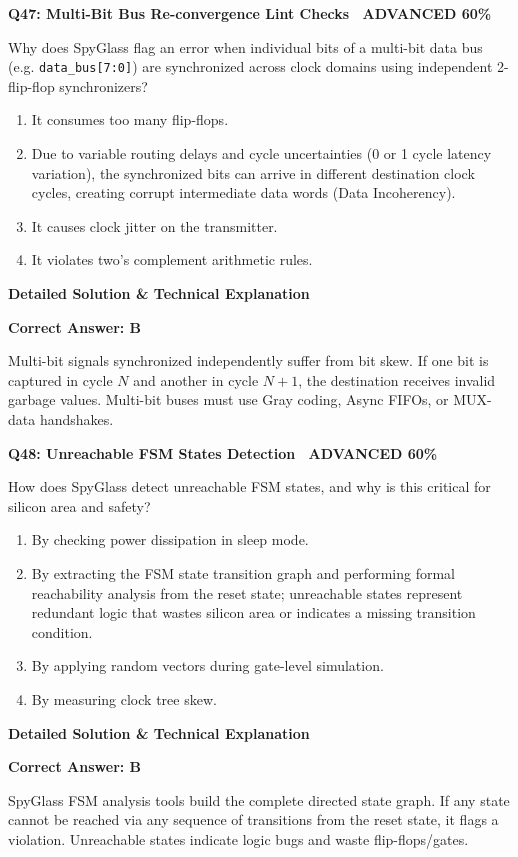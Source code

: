 \documentclass[11pt,a4paper]{article}
\newcommand{\badgeadv}{{\color{white}\colorbox{advred}{\bfseries\sffamily\tiny\ ADVANCED 60\%\ }}}
\newenvironment{qbox}[2]{%
  \begin{mdframed}[style=qstyle]%
  {\bfseries\sffamily\color{primaryblue}#1 \hfill #2}\par\vspace{2pt}%
}{%
  \end{mdframed}%
}
\newenvironment{ansbox}{%
  \begin{mdframed}[style=ansstyle]%
  {\bfseries\sffamily\color{ansgreen}\small Detailed Solution \& Technical Explanation}\par\vspace{2pt}\small%
}{%
  \end{mdframed}%
}
\begin{document}
\begin{qbox}{Q47: Multi-Bit Bus Re-convergence Lint Checks}{\badgeadv}
Why does SpyGlass flag an error when individual bits of a multi-bit data bus (e.g. \texttt{data\_bus[7:0]}) are synchronized across clock domains using independent 2-flip-flop synchronizers?
\begin{enumerate}[label=\textbf{\Alph*.}]
  \item It consumes too many flip-flops.
  \item Due to variable routing delays and cycle uncertainties (0 or 1 cycle latency variation), the synchronized bits can arrive in different destination clock cycles, creating corrupt intermediate data words (Data Incoherency).
  \item It causes clock jitter on the transmitter.
  \item It violates two's complement arithmetic rules.
\end{enumerate}
\end{qbox}
\begin{ansbox}
\textbf{Correct Answer: B}

Multi-bit signals synchronized independently suffer from bit skew. If one bit is captured in cycle $N$ and another in cycle $N+1$, the destination receives invalid garbage values. Multi-bit buses must use Gray coding, Async FIFOs, or MUX-data handshakes.
\end{ansbox}

\begin{qbox}{Q48: Unreachable FSM States Detection}{\badgeadv}
How does SpyGlass detect unreachable FSM states, and why is this critical for silicon area and safety?
\begin{enumerate}[label=\textbf{\Alph*.}]
  \item By checking power dissipation in sleep mode.
  \item By extracting the FSM state transition graph and performing formal reachability analysis from the reset state; unreachable states represent redundant logic that wastes silicon area or indicates a missing transition condition.
  \item By applying random vectors during gate-level simulation.
  \item By measuring clock tree skew.
\end{enumerate}
\end{qbox}
\begin{ansbox}
\textbf{Correct Answer: B}

SpyGlass FSM analysis tools build the complete directed state graph. If any state cannot be reached via any sequence of transitions from the reset state, it flags a violation. Unreachable states indicate logic bugs and waste flip-flops/gates.
\end{ansbox}
\end{document}

